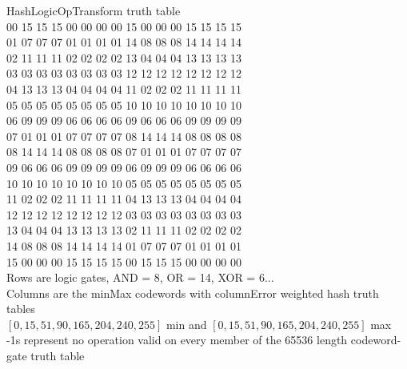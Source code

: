\documentclass[11pt]{article}
\begin{document}
HashLogicOpTransform truth table\\
00 15 15 15 00 00 00 00 15 00 00 00 15 15 15 15 \\
01 07 07 07 01 01 01 01 14 08 08 08 14 14 14 14 \\
02 11 11 11 02 02 02 02 13 04 04 04 13 13 13 13 \\
03 03 03 03 03 03 03 03 12 12 12 12 12 12 12 12 \\
04 13 13 13 04 04 04 04 11 02 02 02 11 11 11 11 \\
05 05 05 05 05 05 05 05 10 10 10 10 10 10 10 10 \\
06 09 09 09 06 06 06 06 09 06 06 06 09 09 09 09 \\
07 01 01 01 07 07 07 07 08 14 14 14 08 08 08 08 \\
08 14 14 14 08 08 08 08 07 01 01 01 07 07 07 07 \\
09 06 06 06 09 09 09 09 06 09 09 09 06 06 06 06 \\
10 10 10 10 10 10 10 10 05 05 05 05 05 05 05 05 \\
11 02 02 02 11 11 11 11 04 13 13 13 04 04 04 04 \\
12 12 12 12 12 12 12 12 03 03 03 03 03 03 03 03 \\
13 04 04 04 13 13 13 13 02 11 11 11 02 02 02 02 \\
14 08 08 08 14 14 14 14 01 07 07 07 01 01 01 01 \\
15 00 00 00 15 15 15 15 00 15 15 15 00 00 00 00 \\

Rows are logic gates, AND = 8, OR = 14, XOR = 6...\\
Columns are the minMax codewords with columnError weighted hash truth tables\\
$[0,15,51,90,165,204,240,255]$ min and $[0,15,51,90,165,204,240,255]$ max\\
-1s represent no operation valid on every member of the 65536 length codeword-gate truth table\\ 
\end{document}
